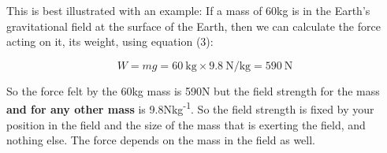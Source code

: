 \documentclass[main.tex]{subfiles}
\begin{document}
This is best illustrated with an example: If a mass of 60kg is in the
Earth's gravitational field at the surface of the Earth, then we can
calculate the force acting on it, its weight, using equation (3):

\[W = mg = \SI{60}{\kg} \times \SI{9.8}{\N\per\kg} = \SI{590}{\N}\]

So the force felt by the 60kg mass is 590N but the field strength for
the mass \textbf{and for any other mass} is 9.8Nkg\textsuperscript{-1}.
So the field strength is fixed by your position in the field and the
size of the mass that is exerting the field, and nothing else. The force
depends on the mass in the field as well.
\end{document}
